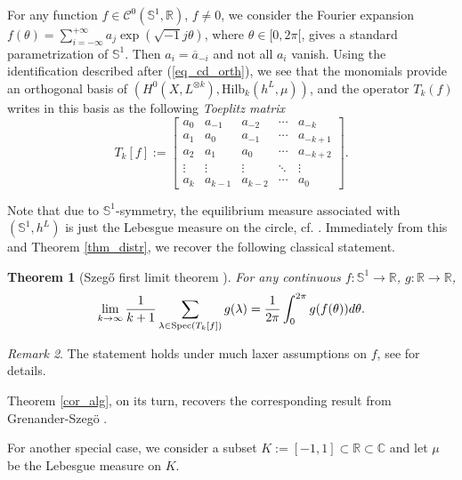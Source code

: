 \documentclass[12pt]{article}
\numberwithin{equation}{section}
\theoremstyle{theorem}
\newtheorem{thm}{Theorem}[section]
\theoremstyle{definition}
\theoremstyle{remark}
\newtheorem{rem}[thm]{Remark}
\newcommand{\imun} {\sqrt{-1}}
\newcommand{\comp}{\mathbb{C}}
\newcommand{\real}{\mathbb{R}}
\newcommand{\ccal}{\mathscr{C}}
\begin{document}
	\begin{sloppypar}
	For any function $f \in \ccal^0(\mathbb{S}^1, \real)$, $f \neq 0$, we consider the Fourier expansion $f(\theta) = \sum_{i = - \infty}^{+ \infty} a_j \exp(\imun j \theta)$, where $\theta \in [0, 2 \pi[$, gives a standard parametrization of $\mathbb{S}^1$. 
	Then $a_i = \overline{a}_{-i}$ and not all $a_i$ vanish.
	Using the identification described after (\ref{eq_cd_orth}), we see that the monomials provide an orthogonal basis of $(H^0(X, L^{\otimes k}), {\textrm{Hilb}}_k(h^L, \mu))$, and the operator $T_k(f)$ writes in this basis as the following \textit{Toeplitz matrix}
	\begin{equation}
		T_k[f]
		:=
		\begin{bmatrix}
		a_0 & a_{-1} & a_{-2} & \cdots & a_{-k} \\
		a_1 & a_0 & a_{-1} & \cdots & a_{-k+1} \\
		a_2 & a_1 & a_0 & \cdots & a_{-k+2} \\
		\vdots & \vdots & \vdots & \ddots & \vdots \\
		a_{k} & a_{k-1} & a_{k-2} & \cdots & a_0
		\end{bmatrix}.
	\end{equation}
	\end{sloppypar}
	\par 
	Note that due to $\mathbb{S}^1$-symmetry, the equilibrium measure associated with $(\mathbb{S}^1, h^L)$ is just the Lebesgue measure on the circle, cf. \cite[Exercise 9.8]{GuedjZeriahBook}.
	Immediately from this and Theorem \ref{thm_distr}, we recover the following classical statement.
	\begin{thm}[{Szegő first limit theorem \cite{SzegoFST}}]
		For any continuous $f : \mathbb{S}^1 \to \real$, $g: \real \to \real$,
		\begin{equation}
			\lim_{k \to \infty} \frac{1}{k + 1} \sum_{\lambda \in {\rm{Spec}} (T_k[f])} g(\lambda)
			=
			\frac{1}{2 \pi}
			\int_0^{2 \pi} g(f(\theta)) d \theta.
		\end{equation}
	\end{thm}
	\begin{rem}
		The statement holds under much laxer assumptions on $f$, see \cite{NikolskiBook} for details.
	\end{rem}
	\par 
	Theorem \ref{cor_alg}, on its turn, recovers the corresponding result from Grenander-Szeg{\"o} \cite[\S 7, 8]{GrenanSzego}.
	\par 
	For another special case, we consider a subset $K := [-1, 1] \subset \real \subset \comp$ and let $\mu$ be the Lebesgue measure on $K$.
\end{document}
